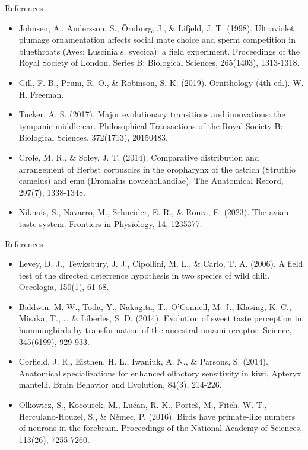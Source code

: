 \documentclass[
  11pt,
  ignorenonframetext,
]{beamer}
\begin{document}
\begin{frame}{References}
\label{references-1}
\begin{itemize}
\item
  Johnsen, A., Andersson, S., Örnborg, J., \& Lifjeld, J. T. (1998).
  Ultraviolet plumage ornamentation affects social mate choice and sperm
  competition in bluethroats (Aves: Luscinia s. svecica): a field
  experiment. Proceedings of the Royal Society of London. Series B:
  Biological Sciences, 265(1403), 1313-1318.
\item
  Gill, F. B., Prum, R. O., \& Robinson, S. K. (2019). Ornithology (4th
  ed.). W. H. Freeman.
\item
  Tucker, A. S. (2017). Major evolutionary transitions and innovations:
  the tympanic middle ear. Philosophical Transactions of the Royal
  Society B: Biological Sciences, 372(1713), 20150483.
\item
  Crole, M. R., \& Soley, J. T. (2014). Comparative distribution and
  arrangement of Herbst corpuscles in the oropharynx of the ostrich
  (Struthio camelus) and emu (Dromaius novaehollandiae). The Anatomical
  Record, 297(7), 1338-1348.
\item
  Niknafs, S., Navarro, M., Schneider, E. R., \& Roura, E. (2023). The
  avian taste system. Frontiers in Physiology, 14, 1235377.
\end{itemize}
\end{frame}

\begin{frame}{References}
\label{references-2}
\begin{itemize}
\item
  Levey, D. J., Tewksbury, J. J., Cipollini, M. L., \& Carlo, T. A.
  (2006). A field test of the directed deterrence hypothesis in two
  species of wild chili. Oecologia, 150(1), 61-68.
\item
  Baldwin, M. W., Toda, Y., Nakagita, T., O'Connell, M. J., Klasing, K.
  C., Misaka, T., \ldots{} \& Liberles, S. D. (2014). Evolution of sweet
  taste perception in hummingbirds by transformation of the ancestral
  umami receptor. Science, 345(6199), 929-933.
\item
  Corfield, J. R., Eisthen, H. L., Iwaniuk, A. N., \& Parsons, S.
  (2014). Anatomical specializations for enhanced olfactory sensitivity
  in kiwi, Apteryx mantelli. Brain Behavior and Evolution, 84(3),
  214-226.
\item
  Olkowicz, S., Kocourek, M., Lučan, R. K., Porteš, M., Fitch, W. T.,
  Herculano-Houzel, S., \& Němec, P. (2016). Birds have primate-like
  numbers of neurons in the forebrain. Proceedings of the National
  Academy of Sciences, 113(26), 7255-7260.
\end{itemize}
\end{frame}
\end{document}
